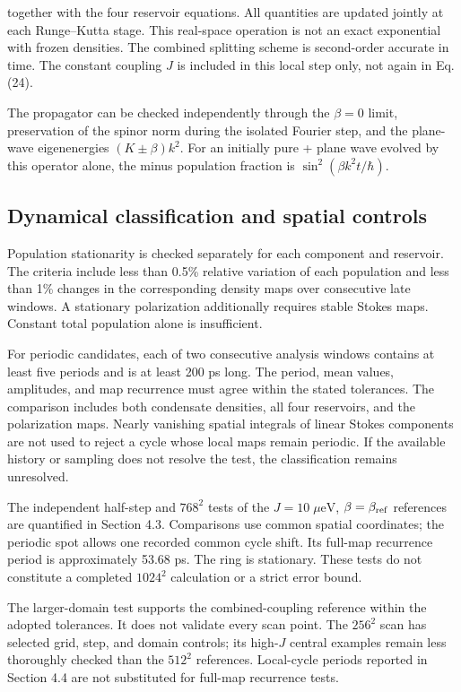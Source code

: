 \documentclass[12pt,a4paper]{article}
\begin{document}
together with the four reservoir equations. All quantities are updated jointly at each Runge--Kutta stage. This real-space operation is not an exact exponential with frozen densities. The combined splitting scheme is second-order accurate in time. The constant coupling \(J\) is included in this local step only, not again in Eq. (24).

The propagator can be checked independently through the \(\beta=0\) limit, preservation of the spinor norm during the isolated Fourier step, and the plane-wave eigenenergies \((K\pm\beta)k^2\). For an initially pure + plane wave evolved by this operator alone, the minus population fraction is \(\sin^2(\beta k^2t/\hbar)\).

\subsection{Dynamical classification and spatial controls}

Population stationarity is checked separately for each component and reservoir. The criteria include less than 0.5\% relative variation of each population and less than 1\% changes in the corresponding density maps over consecutive late windows. A stationary polarization additionally requires stable Stokes maps. Constant total population alone is insufficient.

For periodic candidates, each of two consecutive analysis windows contains at least five periods and is at least 200 ps long. The period, mean values, amplitudes, and map recurrence must agree within the stated tolerances. The comparison includes both condensate densities, all four reservoirs, and the polarization maps. Nearly vanishing spatial integrals of linear Stokes components are not used to reject a cycle whose local maps remain periodic. If the available history or sampling does not resolve the test, the classification remains unresolved.

The independent half-step and \(768^2\) tests of the \(J=10\;\mu\mathrm{eV}\), \(\beta=\beta_{\rm ref}\) references are quantified in Section 4.3. Comparisons use common spatial coordinates; the periodic spot allows one recorded common cycle shift. Its full-map recurrence period is approximately 53.68 ps. The ring is stationary. These tests do not constitute a completed \(1024^2\) calculation or a strict error bound.

The larger-domain test supports the combined-coupling reference within the adopted tolerances. It does not validate every scan point. The \(256^2\) scan has selected grid, step, and domain controls; its high-\(J\) central examples remain less thoroughly checked than the \(512^2\) references. Local-cycle periods reported in Section 4.4 are not substituted for full-map recurrence tests.
\end{document}
